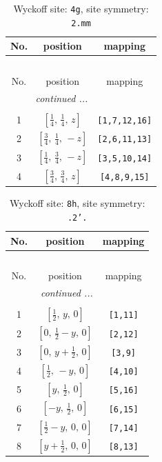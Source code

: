 \documentclass[fleqn,8pt]{jsarticle}
\begin{document}
\renewcommand{\arraystretch}{1.2}
\begin{longtable}{ccc}
\caption{Wyckoff site: {\tt 4g}, site symmetry: {\tt 2.mm}}
 \\
 \hline \hline
No. & position & mapping \\ \hline \endfirsthead

\multicolumn{2}{l}{\tablename\ \thetable{}} \\
 \hline \hline
No. & position & mapping \\ \hline \endhead

 \hline \hline
\multicolumn{2}{r}{\footnotesize\it continued ...} \\ \endfoot

 \hline \hline
\multicolumn{2}{r}{} \\ \endlastfoot

1 & $\left[ \frac{1}{4},\, \frac{1}{4},\, z \right]$ & {\tt [1,7,12,16]} \\ \hline
2 & $\left[ \frac{3}{4},\, \frac{1}{4},\, - z \right]$ & {\tt [2,6,11,13]} \\ \hline
3 & $\left[ \frac{1}{4},\, \frac{3}{4},\, - z \right]$ & {\tt [3,5,10,14]} \\ \hline
4 & $\left[ \frac{3}{4},\, \frac{3}{4},\, z \right]$ & {\tt [4,8,9,15]} \\
\end{longtable}
\renewcommand{\arraystretch}{1.2}
\begin{longtable}{ccc}
\caption{Wyckoff site: {\tt 8h}, site symmetry: {\tt .2'.}}
 \\
 \hline \hline
No. & position & mapping \\ \hline \endfirsthead

\multicolumn{2}{l}{\tablename\ \thetable{}} \\
 \hline \hline
No. & position & mapping \\ \hline \endhead

 \hline \hline
\multicolumn{2}{r}{\footnotesize\it continued ...} \\ \endfoot

 \hline \hline
\multicolumn{2}{r}{} \\ \endlastfoot

1 & $\left[ \frac{1}{2},\, y,\, 0 \right]$ & {\tt [1,11]} \\ \hline
2 & $\left[ 0,\, \frac{1}{2} - y,\, 0 \right]$ & {\tt [2,12]} \\ \hline
3 & $\left[ 0,\, y + \frac{1}{2},\, 0 \right]$ & {\tt [3,9]} \\ \hline
4 & $\left[ \frac{1}{2},\, - y,\, 0 \right]$ & {\tt [4,10]} \\ \hline
5 & $\left[ y,\, \frac{1}{2},\, 0 \right]$ & {\tt [5,16]} \\ \hline
6 & $\left[ - y,\, \frac{1}{2},\, 0 \right]$ & {\tt [6,15]} \\ \hline
7 & $\left[ \frac{1}{2} - y,\, 0,\, 0 \right]$ & {\tt [7,14]} \\ \hline
8 & $\left[ y + \frac{1}{2},\, 0,\, 0 \right]$ & {\tt [8,13]} \\
\end{longtable}
\end{document}
